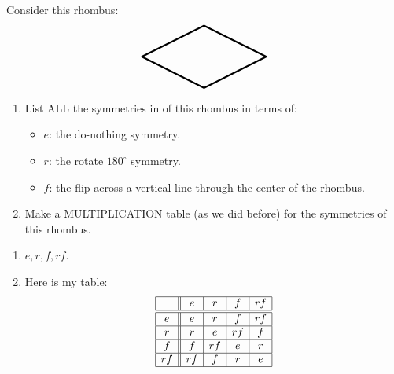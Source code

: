 \documentclass[noauthor,nooutcomes,12pt,hints,handout]{ximera}
\begin{document}
\begin{question}
  Consider this rhombus:
  \[ 
  \begin{tikzpicture}
    \draw[ultra thick,rounded corners=.05mm] (0,0) -- (2,-1) -- (4,0) -- (2,1)-- cycle;
  \end{tikzpicture}
  \]
  \begin{enumerate}
  \item List ALL the symmetries in of this rhombus in terms of:
    \begin{itemize}
    \item $e$: the do-nothing symmetry.
    \item $r$: the rotate $180^\circ$ symmetry.
    \item $f$: the flip across a vertical line through the center of the rhombus.
    \end{itemize}
  \item Make a MULTIPLICATION table (as we did before) for the
    symmetries of this rhombus.
  \end{enumerate}
  \begin{freeResponse}
    \begin{enumerate}
    \item $e, r,f,rf$.
    \item Here is my table:
             \[
  \begin{array}{|c||c|c|c|c|c|c|}
    \hline
       & e  & r  & f  & rf \\ \hline\hline
    e  & e  & r  & f  & rf \\ \hline
    r  & r  & e  & rf & f \\ \hline
    f  & f  & rf & e  & r \\ \hline
    rf & rf & f  & r  & e \\ \hline
  \end{array}
  \]
    \end{enumerate}
  \end{freeResponse}
\end{question}

\mynewpage
\end{document}
